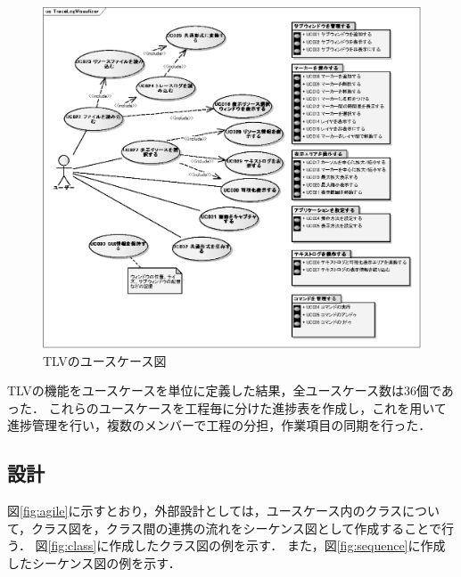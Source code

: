 \begin{figure}[t]
\begin{center}
\includegraphics[scale=0.75]{img/usecase.eps}
\caption{TLVのユースケース図}
\label{fig:usecase}
\end{center}
\end{figure}

TLVの機能をユースケースを単位に定義した結果，全ユースケース数は36個であった．
これらのユースケースを工程毎に分けた進捗表を作成し，これを用いて進捗管理を行い，複数のメンバーで工程の分担，作業項目の同期を行った．

\subsection{設計}

図\ref{fig:agile}に示すとおり，外部設計としては，ユースケース内のクラスについて，クラス図を，クラス間の連携の流れをシーケンス図として作成することで行う．
図\ref{fig:class}に作成したクラス図の例を示す．
また，図\ref{fig:sequence}に作成したシーケンス図の例を示す．

